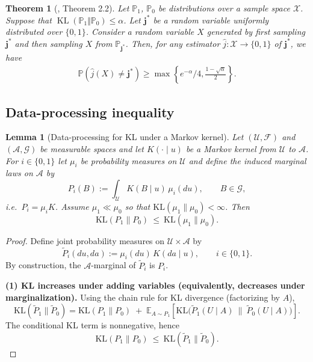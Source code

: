\documentclass[11pt]{article}
\renewcommand{\P}{\mathbb{P}}
\newcommand{\cX}{\mathcal{X}}
\newcommand{\bbP}{\mathbb{P}}
\newcommand{\KL}[2]{\operatorname{KL}\left (#1\Vert #2 \right )}
\newcommand{\<}{\langle}
\renewcommand{\>}{\rangle}
\newcommand{\bj}{\mathbf{j}}
\theoremstyle{plain}
\newtheorem{theorem}{Theorem}
\newtheorem{lemma}{Lemma}
\theoremstyle{definition}
\theoremstyle{remark}
\begin{document}
{\begin{theorem}[\citep{tsybakov_introduction_2009}, Theorem 2.2]
\label{theorem: fano's lemma}
Let $\bbP_1$, $\bbP_0$ be distributions over a sample space $\cX$. Suppose that $\KL{\bbP_1}{\bbP_0} \le \alpha$. Let $\bj^*$ be a random variable uniformly distributed over $\{0, 1\}$. Consider a random variable $X$ generated by first sampling $\bj^*$ and then sampling $X$ from $\bbP_{\bj^*}$. Then, for any estimator $\widehat{j} : \cX \to \{0, 1\}$ of $\bj^*$, we have
\begin{align*}
    \P\left (\widehat{j}(X) \neq \bj^* \right ) \ge \max \left \{ e^{-\alpha}/4, \frac{1 - \sqrt{\alpha}}{2} \right \}.
\end{align*}
\end{theorem}

\subsection{Data-processing inequality}

\begin{lemma}[Data-processing for KL under a Markov kernel]
	\label{lem:dp_kl_markov_kernel}
	Let $(\mathcal U,\mathcal F)$ and $(\mathcal A,\mathcal G)$ be measurable spaces and
	let $K(\cdot\mid u)$ be a Markov kernel from $\mathcal U$ to $\mathcal A$.
	For $i\in\{0,1\}$ let $\mu_i$ be probability measures on $\mathcal U$ and define the induced
	marginal laws on $\mathcal A$ by
	\[
	P_i(B) := \int_{\mathcal U} K(B\mid u)\,\mu_i(du),
	\qquad B\in\mathcal G,
	\]
	i.e.\ $P_i = \mu_i K$.
	Assume $\mu_1\ll \mu_0$ so that $\mathrm{KL}(\mu_1\|\mu_0)<\infty$.
	Then
	\[
	\mathrm{KL}(P_1\|P_0)\ \le\ \mathrm{KL}(\mu_1\|\mu_0).
	\]
\end{lemma}

\begin{proof}
	Define joint probability measures on $\mathcal U\times \mathcal A$ by
	\[
	\widetilde P_i(du,da) := \mu_i(du)\,K(da\mid u),
	\qquad i\in\{0,1\}.
	\]
	By construction, the $\mathcal A$-marginal of $\widetilde P_i$ is $P_i$.
	
	\smallskip
	\noindent\textbf{(1) KL increases under adding variables (equivalently, decreases under marginalization).}
	Using the chain rule for KL divergence (factorizing by $A$),
	\[
	\mathrm{KL}(\widetilde P_1\|\widetilde P_0)
	=
	\mathrm{KL}(P_1\|P_0)
	\;+\;
	\mathbb E_{A\sim P_1}\!\left[
	\mathrm{KL}\big(\widetilde P_1(U\mid A)\ \|\ \widetilde P_0(U\mid A)\big)
	\right].
	\]
	The conditional KL term is nonnegative, hence
	\[
	\mathrm{KL}(P_1\|P_0)\ \le\ \mathrm{KL}(\widetilde P_1\|\widetilde P_0).
	\]
	

\end{proof}}
\end{document}
